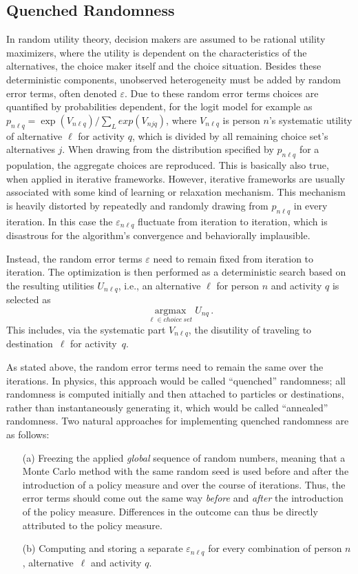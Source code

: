 \subsection{Quenched Randomness}
In random utility theory, decision makers are assumed to be rational utility maximizers, where the utility is dependent on the characteristics of the alternatives, the choice maker itself and the choice situation. Besides these deterministic components, unobserved heterogeneity must be added by random error terms, often denoted $\varepsilon$. Due to these random error terms choices are quantified by probabilities dependent, for the logit model for example as $p_{n\ell q} = \exp(V_{n\ell q}) / \sum_L exp(V_{njq})$, where $V_{n\ell q}$ is person $n$'s systematic utility of alternative $\ell$ for activity $q$, which is divided by all remaining choice set's alternatives $j$. When drawing from the distribution specified by $p_{n\ell q}$ for a population, the aggregate choices are reproduced. This is basically also true, when applied in iterative frameworks. However, iterative frameworks are usually associated with some kind of learning or relaxation mechanism. This mechanism is heavily distorted by repeatedly and randomly drawing from $p_{n\ell q}$ in every iteration. In this case the $\varepsilon_{n\ell q}$ fluctuate from iteration to iteration, which is disastrous for the algorithm's convergence and behaviorally implausible.

Instead, the random error terms $\varepsilon$ need to remain fixed from iteration to iteration. The optimization is then performed as a deterministic search based on the resulting utilities $U_{n\ell q}$, i.e., an alternative $\ell$ for person $n$ and activity $q$ is selected as 
\[ 
\underset{\ell \in choice\: set}{\operatorname{argmax}} U_{nq} \,.
\] 
This includes, via the systematic part $V_{n\ell q}$, the disutility of traveling to destination~$\ell$ for activity~$q$.

As stated above, the random error terms need to remain the same over the iterations. In physics, this approach would be called ``quenched'' randomness; all randomness is computed initially and then attached to particles or destinations, rather than instantaneously generating it, which would be called ``annealed'' randomness. Two natural approaches for implementing quenched randomness are as follows:
\begin{itemize}
\item[(a)] Freezing the applied \emph{global} sequence of random numbers, meaning that a Monte Carlo method with the same random seed is used before and after the introduction of a policy measure and over the course of iterations. Thus, the error terms should come out the same way \emph{before} and \emph{after} the introduction of the policy measure. Differences in the outcome can thus be directly attributed to the policy measure. 
\item[(b)] Computing and storing a separate $\varepsilon_{n\ell q}$ for every combination of person $n$, alternative~$\ell$ and activity $q$.
\end{itemize}
 
